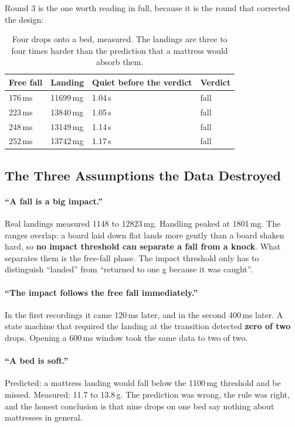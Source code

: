 Round 3 is the one worth reading in full, because it is the round that corrected the design:

\begin{table}[H]
\centering
\begin{tabular}{llll}
\hline
\textbf{Free fall} & \textbf{Landing} & \textbf{Quiet before the verdict} & \textbf{Verdict} \\
\hline
176\,ms & 11699\,mg & 1.04\,s & fall \\
223\,ms & 13840\,mg & 1.05\,s & fall \\
248\,ms & 13149\,mg & 1.14\,s & fall \\
252\,ms & 13742\,mg & 1.17\,s & fall \\
\hline
\end{tabular}
\caption{Four drops onto a bed, measured. The landings are three to four times harder than
the prediction that a mattress would absorb them.}
\label{tab:bed-round}
\end{table}

\subsection{The Three Assumptions the Data Destroyed}

\paragraph{``A fall is a big impact.''} Real landings measured 1148 to 12823\,mg. Handling
peaked at 1801\,mg. The ranges overlap: a board laid down flat lands more gently than a board
shaken hard, so \textbf{no impact threshold can separate a fall from a knock}. What separates
them is the free-fall phase. The impact threshold only has to distinguish ``landed'' from
``returned to one g because it was caught''.

\paragraph{``The impact follows the free fall immediately.''} In the first recordings it came
120\,ms later, and in the second 400\,ms later. A state machine that required the landing at
the transition detected \textbf{zero of two} drops. Opening a 600\,ms window took the same data
to two of two.

\paragraph{``A bed is soft.''} Predicted: a mattress landing would fall below the 1100\,mg
threshold and be missed. Measured: 11.7 to 13.8\,g. The prediction was wrong, the rule was
right, and the honest conclusion is that nine drops on one bed say nothing about mattresses
in general.

